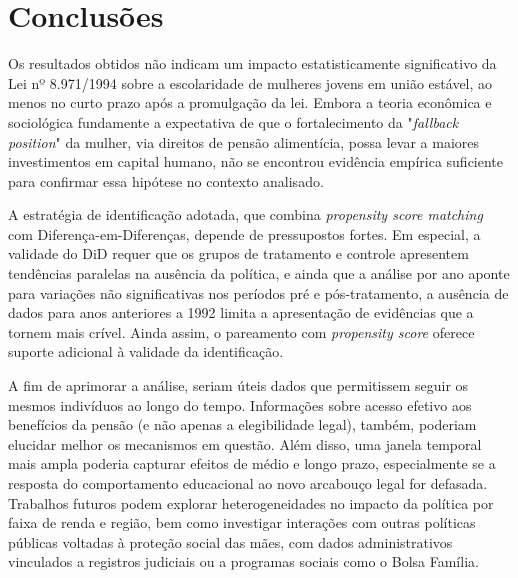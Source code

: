 \documentclass[12pt,oneside,a4paper]{article}
\begin{document}




\section{Conclusões}

Os resultados obtidos não indicam um impacto estatisticamente significativo da Lei nº 8.971/1994 sobre a escolaridade de mulheres jovens em união estável, ao menos no curto prazo após a promulgação da lei. Embora a teoria econômica e sociológica fundamente a expectativa de que o fortalecimento da "\textit{fallback position}" da mulher, via direitos de pensão alimentícia, possa levar a maiores investimentos em capital humano, não se encontrou evidência empírica suficiente para confirmar essa hipótese no contexto analisado.

A estratégia de identificação adotada, que combina \textit{propensity score matching} com Diferença-em-Diferenças, depende de pressupostos fortes. Em especial, a validade do DiD requer que os grupos de tratamento e controle apresentem tendências paralelas na ausência da política, e ainda que a análise por ano aponte para variações não significativas nos períodos pré e pós-tratamento, a ausência de dados para anos anteriores a 1992 limita a apresentação de evidências que a tornem mais crível. Ainda assim, o pareamento com \textit{propensity score} oferece suporte adicional à validade da identificação.

A fim de aprimorar a análise, seriam úteis dados que permitissem seguir os mesmos indivíduos ao longo do tempo. Informações sobre acesso efetivo aos benefícios da pensão (e não apenas a elegibilidade legal), também, poderiam elucidar melhor os mecanismos em questão. Além disso, uma janela temporal mais ampla poderia capturar efeitos de médio e longo prazo, especialmente se a resposta do comportamento educacional ao novo arcabouço legal for defasada. Trabalhos futuros podem explorar heterogeneidades no impacto da política por faixa de renda e região, bem como investigar interações com outras políticas públicas voltadas à proteção social das mães, com dados administrativos vinculados a registros judiciais ou a programas sociais como o Bolsa Família.


\newpage


\end{document}
